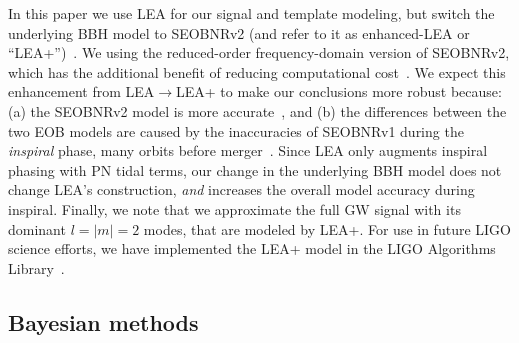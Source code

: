 \documentclass[aps,prd,amsmath,floats,floatfix, twocolumn,
superscriptaddress,nofootinbib,showpacs]{revtex4-1}
\newcommand{\red}{\textcolor{red}}
\begin{document}
In this paper we use LEA for our signal and template modeling, but switch the 
underlying BBH model to SEOBNRv2 (and refer to it as enhanced-LEA or
``LEA+'')~\cite{Taracchini:2013rva}. We using the reduced-order
frequency-domain version of SEOBNRv2, which has the additional benefit of
reducing computational cost~\cite{Purrer:2015tud}. We expect this enhancement
from LEA$\rightarrow$LEA+ to make our conclusions more robust because: (a) the 
SEOBNRv2 model is more accurate~\cite{Kumar:2015tha,Kumar:2016dhh}, and (b)
the differences between the two EOB models are caused by the
inaccuracies of SEOBNRv1 during the {\it inspiral} phase, many orbits before 
merger~\cite{Kumar:2015tha}.
Since LEA only augments inspiral phasing with PN tidal terms, our
change in the underlying BBH model does not change LEA's construction, {\it and}
increases the overall model accuracy during inspiral.
% 
Finally, we note that we approximate the full GW signal with its dominant
$l=|m|=2$ modes, that are modeled by LEA+. For use in future LIGO science
efforts, we have implemented the LEA+ model in the LIGO Algorithms
Library~\cite{LAL}.


\subsection{Bayesian methods}\label{s2:bayesian}
\end{document}
